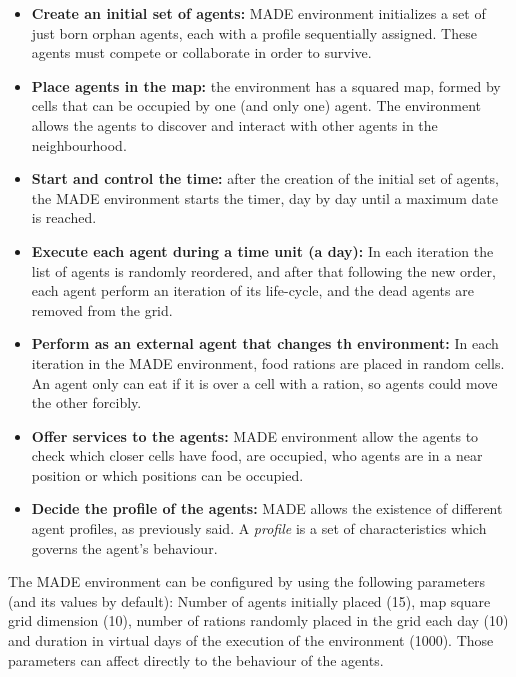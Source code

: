 \documentclass[runningheads]{llncs}
\begin{document}
\begin{itemize}
\item \textbf{Create an initial set of agents:} MADE environment
  initializes a set of just born orphan agents, each with a profile
  sequentially assigned.
 These agents must compete or collaborate in order to survive.
\item \textbf{Place agents in the map:} the environment has a squared map, formed by cells that can be occupied by one (and only one) agent. The environment allows the agents to discover and interact with other agents in the neighbourhood.
\item \textbf{Start and control the time:} after the creation of the initial set of agents, the MADE environment starts the timer, day by day until a maximum date is reached.
\item \textbf{Execute each agent during a time unit (a day):} In each iteration the list of agents is randomly reordered, and after that following the new order, each agent perform an iteration of its life-cycle, and the dead agents are removed from the grid.
\item \textbf{Perform as an external agent that changes th environment:} In each iteration in the MADE environment, food rations are placed in random cells. An agent only can eat if it is over a cell with a ration, so agents could move the other forcibly.
\item \textbf{Offer services to the agents:} MADE environment allow the agents to check which closer cells have food, are occupied, who agents are in a near position or which positions can be occupied.
\item \textbf{Decide the profile of the agents:} MADE allows the existence of different agent profiles, as previously said. A {\em profile} is a set of characteristics which governs the agent's behaviour.
\end{itemize}

The MADE environment can be configured by using the following parameters (and its values by default): Number of agents initially placed (15), map square grid dimension (10), number of rations randomly placed in the grid each day (10) and duration in virtual days of the  execution of the environment (1000). Those parameters can affect directly to the behaviour of the agents.

\end{document}
